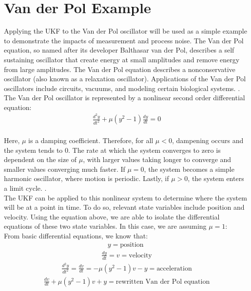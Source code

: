 \section{Van der Pol Example}
\label{Van der Pol Example}


Applying the UKF to the Van der Pol oscillator will be used as a simple example to demonstrate the impacts of measurement and process noise. The Van der Pol equation, so named after its developer Balthasar van der Pol, describes a self sustaining oscillator that create energy at small amplitudes and remove energy from large amplitudes. The Van der Pol equation describes a nonconservative oscillator (also known as a relaxation oscillator). Applications of the Van der Pol oscillators include circuits, vacuums, and modeling certain biological systems. 
 \cite{weisstein_2019}. The Van der Pol oscillator is represented by a nonlinear second order differential equation: \\
\begin{align*}
\frac{d^2y}{dt^2} + \mu(y^2-1)\frac{dy}{dt} = 0
\end{align*}   \\
Here, $\mu$ is a damping coefficient. Therefore, for all $\mu < 0$, dampening occurs and the system tends to 0. The rate at which the system converges to zero is dependent on the size of $\mu$, with larger values taking longer to converge and smaller values converging much faster. If $\mu = 0$, the system becomes a simple harmonic oscillator, where motion is periodic. Lastly, if $\mu > 0$, the system enters a limit cycle.     \cite{kinoshita_2013}. \\ 

\noindent The UKF can be applied to this nonlinear system to determine where the system will be at a point in time. To do so, relevant state variables include position and velocity. Using the equation above, we are able to isolate the differential equations of these two state variables. In this case, we are assuming $\mu = 1$:\\ 

\noindent From basic differential equations, we know that: 
\begin{align*}
   y = \text{position }
  \end{align*}
 \begin{align*}
  \frac{dy}{dt}  = v = \text{velocity}
  \end{align*}
  \begin{align*}
  \frac{d^2y}{dt^2}  =  \frac{dv}{dt}  = -\mu (y^2 - 1)v - y =\text{acceleration}
  \end{align*}
  \begin{align*}
 	\frac{dv}{dt}  +\mu(y ^2-1)v + y  = \text{rewritten Van der Pol equation}
 \end{align*}
 
